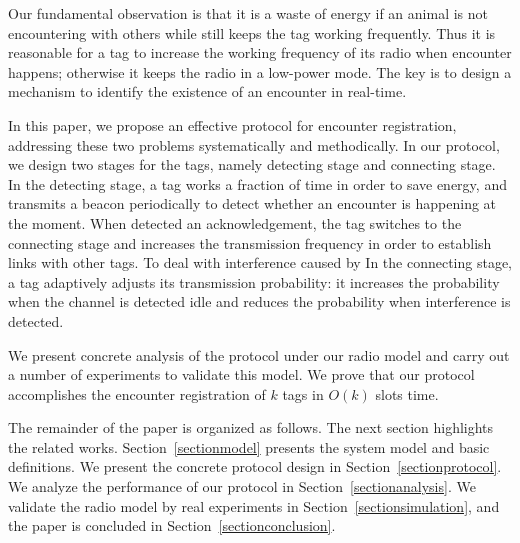 Our fundamental observation is that it is a waste of 
energy if an animal is not encountering with others
while still keeps the tag working frequently.
Thus it is reasonable for a tag to
increase the working frequency of its radio when 
encounter happens; otherwise it keeps
the radio in a low-power mode. The key is to design a mechanism
to identify the existence of an encounter in real-time. 



In this paper, we propose an effective protocol for encounter registration, 
addressing these two problems systematically and
methodically. In our protocol, we design two stages for the tags, 
namely detecting stage and connecting stage.
In the detecting stage, a tag works a fraction of time in order to save energy,
and transmits a beacon periodically to detect whether an encounter is happening at the moment.
When detected an acknowledgement, the tag switches to the connecting stage and increases the 
transmission frequency in order to establish links with other tags. To deal with interference 
caused by 
In the connecting stage,
a tag adaptively adjusts its transmission probability: it increases the probability when 
the channel is detected idle and reduces the probability when interference is detected.  


We present concrete analysis of the protocol under our radio model
and carry out a number of experiments to validate this model.
We prove that our protocol accomplishes the encounter registration
of $k$ tags in $O(k)$ slots time.


The remainder of the paper is organized as follows. 
The next section highlights the related works.
Section~\ref{sectionmodel} presents the system model and basic definitions.
We present the concrete protocol design
in Section~\ref{sectionprotocol}. We  
analyze the performance of our protocol in Section~\ref{sectionanalysis}. 
We validate the radio model by real experiments in Section~\ref{sectionsimulation}, 
and the paper is concluded in Section~\ref{sectionconclusion}.